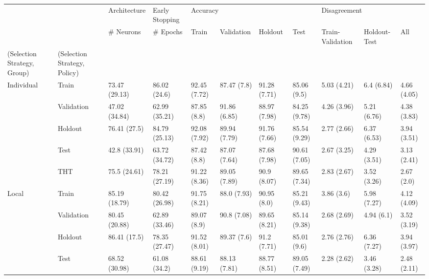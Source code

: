 \begin{table}
\centering
\label{tab:high_generalization_performance}
\begin{tabular}{lllllllllll}
\toprule
       &     &   Architecture & Early Stopping & \multicolumn{4}{l}{Accuracy} & \multicolumn{3}{l}{Disagreement} \\
       &     &      \# Neurons &       \# Epochs &          Train &    Validation &       Holdout &          Test & Train-Validation & Holdout-Test &          All \\
(Selection Strategy, Group) & (Selection Strategy, Policy) &                &                &                &               &               &               &                  &              &              \\
\midrule
Individual & Train &  73.47 (29.13) &   86.02 (24.6) &   92.45 (7.72) &   87.47 (7.8) &  91.28 (7.71) &   85.06 (9.5) &      5.03 (4.21) &   6.4 (6.84) &  4.66 (4.05) \\
       & Validation &  47.02 (34.84) &  62.99 (35.21) &    87.85 (8.8) &  91.86 (6.85) &  88.97 (7.98) &  84.25 (9.78) &      4.26 (3.96) &  5.21 (6.76) &  4.38 (3.83) \\
       & Holdout &   76.41 (27.5) &  84.79 (25.13) &   92.08 (7.92) &  89.94 (7.79) &  91.76 (7.66) &  85.54 (9.29) &      2.77 (2.66) &  6.37 (6.53) &  3.94 (3.51) \\
       & Test &   42.8 (33.91) &  63.72 (34.72) &    87.42 (8.8) &  87.07 (7.64) &  87.68 (7.98) &  90.61 (7.05) &      2.67 (3.25) &  4.29 (3.51) &  3.13 (2.41) \\
       & THT &   75.5 (24.61) &  78.21 (27.19) &   91.22 (8.36) &  89.05 (7.89) &   90.9 (8.07) &  89.65 (7.34) &      2.83 (2.67) &  3.52 (3.26) &   2.67 (2.0) \\
Local & Train &  85.19 (18.79) &  80.42 (26.98) &   91.75 (8.21) &   88.0 (7.93) &   90.95 (8.0) &  85.21 (9.43) &       3.86 (3.6) &  5.98 (7.27) &  4.12 (4.09) \\
       & Validation &  80.45 (20.88) &  62.89 (33.46) &    89.07 (8.9) &   90.8 (7.08) &  89.65 (8.21) &  85.14 (9.38) &      2.68 (2.69) &   4.94 (6.1) &  3.52 (3.19) \\
       & Holdout &   86.41 (17.5) &  78.35 (27.47) &   91.52 (8.01) &   89.37 (7.6) &   91.2 (7.71) &   85.01 (9.6) &      2.76 (2.76) &  6.36 (7.27) &  3.94 (3.97) \\
       & Test &  68.52 (30.98) &   61.08 (34.2) &   88.61 (9.19) &  88.13 (7.81) &  88.77 (8.51) &  89.05 (7.49) &      2.28 (2.62) &  3.46 (3.28) &  2.48 (2.11) \\

\end{tabular}
\end{table}
